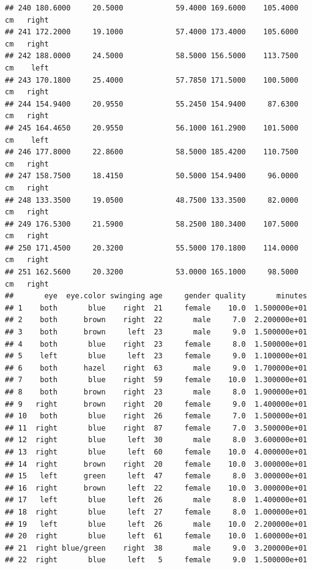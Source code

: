 \documentclass[]{article}
\begin{document}
\begin{verbatim}
## 240 180.6000     20.5000            59.4000 169.6000    105.4000     cm   right
## 241 172.2000     19.1000            57.4000 173.4000    105.6000     cm   right
## 242 188.0000     24.5000            58.5000 156.5000    113.7500     cm    left
## 243 170.1800     25.4000            57.7850 171.5000    100.5000     cm   right
## 244 154.9400     20.9550            55.2450 154.9400     87.6300     cm   right
## 245 164.4650     20.9550            56.1000 161.2900    101.5000     cm    left
## 246 177.8000     22.8600            58.5000 185.4200    110.7500     cm   right
## 247 158.7500     18.4150            50.5000 154.9400     96.0000     cm   right
## 248 133.3500     19.0500            48.7500 133.3500     82.0000     cm   right
## 249 176.5300     21.5900            58.2500 180.3400    107.5000     cm   right
## 250 171.4500     20.3200            55.5000 170.1800    114.0000     cm   right
## 251 162.5600     20.3200            53.0000 165.1000     98.5000     cm   right
##       eye  eye.color swinging age     gender quality       minutes
## 1    both       blue    right  21     female    10.0  1.500000e+01
## 2    both      brown    right  22       male     7.0  2.200000e+01
## 3    both      brown     left  23       male     9.0  1.500000e+01
## 4    both       blue    right  23     female     8.0  1.500000e+01
## 5    left       blue     left  23     female     9.0  1.100000e+01
## 6    both      hazel    right  63       male     9.0  1.700000e+01
## 7    both       blue    right  59     female    10.0  1.300000e+01
## 8    both      brown    right  23       male     8.0  1.900000e+01
## 9   right      brown    right  20     female     9.0  1.400000e+01
## 10   both       blue    right  26     female     7.0  1.500000e+01
## 11  right       blue    right  87     female     7.0  3.500000e+01
## 12  right       blue     left  30       male     8.0  3.600000e+01
## 13  right       blue     left  60     female    10.0  4.000000e+01
## 14  right      brown    right  20     female    10.0  3.000000e+01
## 15   left      green     left  47     female     8.0  3.000000e+01
## 16  right      brown     left  22     female    10.0  3.000000e+01
## 17   left       blue     left  26       male     8.0  1.400000e+01
## 18  right       blue     left  27     female     8.0  1.000000e+01
## 19   left       blue     left  26       male    10.0  2.200000e+01
## 20  right       blue     left  61     female    10.0  1.600000e+01
## 21  right blue/green    right  38       male     9.0  3.200000e+01
## 22  right       blue     left   5     female     9.0  1.500000e+01

\end{verbatim}
\end{document}
